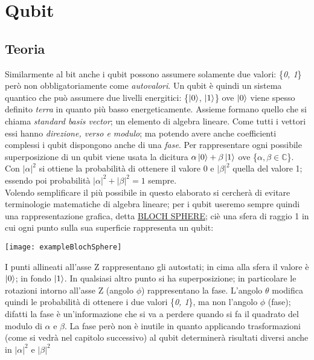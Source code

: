 \section{Qubit}
\subsection{Teoria}
Similarmente al bit anche i qubit possono assumere solamente due valori: \{\textit{0, 1}\} però non obbligatoriamente come \textit{autovalori}.
Un qubit è quindi un sistema quantico che può assumere due livelli energitici: \{$\ket{0}$, $\ket{1}$\} ove $\ket{0}$ viene spesso definito \textit{terra} in quanto più basso energeticamente.  Assieme formano quello che si chiama \textit{standard basis vector}; un elemento di algebra lineare. Come tutti i vettori essi hanno \textit{direzione, verso e modulo}; ma potendo avere anche coefficienti complessi i qubit dispongono anche di una \textit{fase}. Per rappresentare ogni possibile superposizione di un qubit viene usata la dicitura $\alpha\ket{0} + \beta\ket{1}$ ove \{$\alpha,\beta \in \mathbb{C}$\}. Con $|\alpha|^2$ si ottiene la probabilità di ottenere il valore 0 e $|\beta|^2$ quella del valore 1; essendo poi probabilità $|\alpha|^2 + |\beta|^2 = 1$ sempre.\\
Volendo semplificare il più possibile in questo elaborato si cercherà di evitare terminologie matematiche di algebra lineare; per i qubit useremo sempre quindi una rappresentazione grafica, detta \underline{BLOCH SPHERE}; ciè una sfera di raggio 1 in cui ogni punto sulla sua superficie rappresenta un qubit:\\
\begin{center}
\texttt{[image: exampleBlochSphere]}
\end{center}
I punti allineati all'asse Z rappresentano gli autostati; in cima alla sfera il valore è $\ket{0}$; in fondo $\ket{1}$. In qualsiasi altro punto si ha superposizione; in particolare le rotazioni intorno all'asse Z (angolo $\phi$) rappresentano la fase. L'angolo $\theta$ modifica quindi le probabilità di ottenere i due valori \{\textit{0, 1}\}, ma non l'angolo $\phi$ (fase); difatti la fase è un'informazione che si va a perdere quando si fa il quadrato del modulo di $\alpha$ e $\beta$. La fase però non è inutile in quanto applicando trasformazioni (come si vedrà nel capitolo successivo) al qubit determinerà risultati diversi anche in $|\alpha|^2$ e $|\beta|^2$
